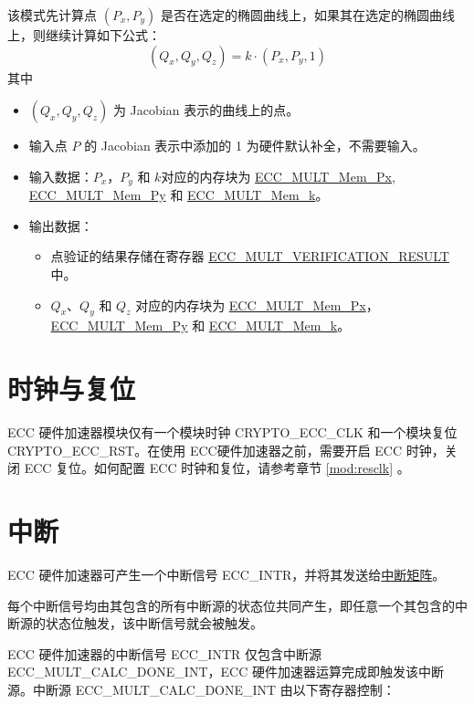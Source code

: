 \documentclass[main\_\_CN.tex]{subfiles}
\begin{document}
该模式先计算点 $(P_x,P_y)$ 是否在选定的椭圆曲线上，如果其在选定的椭圆曲线上，则继续计算如下公式：
\[
(Q_x,Q_y,Q_z) = k \cdot (P_x,P_y,1)
\]
其中
\begin{itemize}
    \item $(Q_x,Q_y,Q_z)$ 为 Jacobian 表示的曲线上的点。
    \item 输入点 $P$ 的 Jacobian 表示中添加的 1 为硬件默认补全，不需要输入。
    \item 输入数据：$P_x$，$P_y$ 和 $k$对应的内存块为 \hyperref[tab:ecc-memory]{ECC\_MULT\_Mem\_Px}, \hyperref[tab:ecc-memory]{ECC\_MULT\_Mem\_Py} 和 \hyperref[tab:ecc-memory]{ECC\_MULT\_Mem\_k}。
    \item 输出数据：
    \begin{itemize}
        \item 点验证的结果存储在寄存器 \hyperref[fielddesc:ECCMULTVERIFICATIONRESULT]{ECC\_MULT\_VERIFICATION\_RESULT} 中。
        \item $Q_x$、$Q_y$ 和 $Q_z$ 对应的内存块为 \hyperref[tab:ecc-memory]{ECC\_MULT\_Mem\_Px}，\hyperref[tab:ecc-memory]{ECC\_MULT\_Mem\_Py} 和 \hyperref[tab:ecc-memory]{ECC\_MULT\_Mem\_k}。
    \end{itemize}
\end{itemize}

\section{时钟与复位} 
\chipname{} ECC 硬件加速器模块仅有一个模块时钟 CRYPTO\_ECC\_CLK 和一个模块复位 CRYPTO\_ECC\_RST。在使用 ECC硬件加速器之前，需要开启 ECC 时钟，关闭 ECC 复位。如何配置 ECC 时钟和复位，请参考章节 \ref{mod:resclk} \textit{}。

\section{中断}
\label{sec:ecc-interrupt}

\chipname{} ECC 硬件加速器可产生一个中断信号 ECC\_INTR，并将其发送给\hyperref[mod:intmtrx]{中断矩阵}。

\begin{tiplisting}
每个中断信号均由其包含的所有中断源的状态位共同产生，即任意一个其包含的中断源的状态位触发，该中断信号就会被触发。
\end{tiplisting}

ECC 硬件加速器的中断信号 ECC\_INTR 仅包含中断源 \label{int:ECCMULTCALCDONEINT}ECC\_MULT\_CALC\_DONE\_INT，ECC 硬件加速器运算完成即触发该中断源。中断源 ECC\_MULT\_CALC\_DONE\_INT 由以下寄存器控制：
\end{document}
